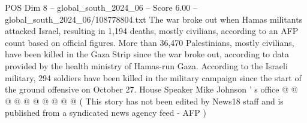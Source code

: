 \begin{textsample}{POS Dim 8 – global\_south\_2024\_06 – Score 6.00 – global\_south\_2024\_06/108778804.txt}
The war broke out when Hamas militants attacked Israel, resulting in 1,194 deaths, mostly civilians, according to an AFP count based on official figures.
More than 36,470 Palestinians, mostly civilians, have been killed in the Gaza Strip since the war broke out, according to data provided by the health ministry of Hamas-run Gaza.
According to the Israeli military, 294 soldiers have been killed in the military campaign since the start of the ground offensive on October 27.
House Speaker Mike Johnson ' s office @ @ @ @ @ @ @ @ @ @ ( This story has not been edited by News18 staff and is published from a syndicated news agency feed - AFP )

\end{textsample}
